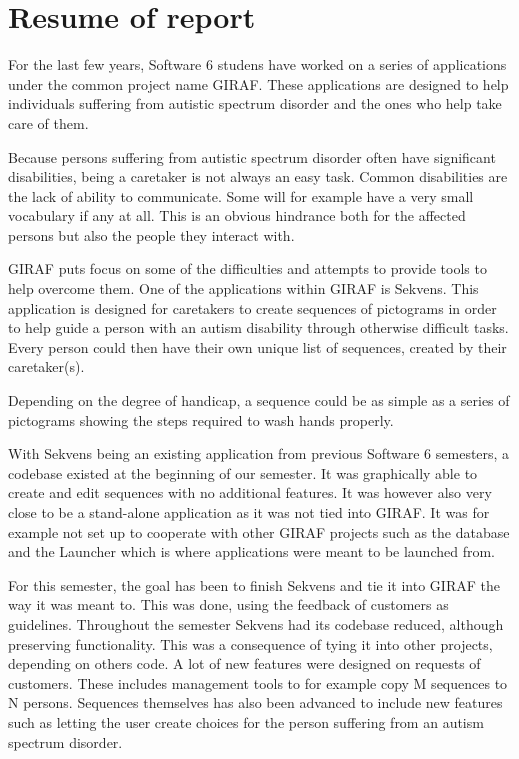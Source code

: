 \chapter{Resume of report}\label{app:resume}
For the last few years, Software 6 studens have worked on a series of applications under the common project name GIRAF. These applications are designed to help individuals suffering from autistic spectrum disorder and the ones who help take care of them.

Because persons suffering from autistic spectrum disorder often have significant disabilities, being a caretaker is not always an easy task. Common disabilities are the lack of ability to communicate. Some will for example have a very small vocabulary if any at all. This is an obvious hindrance both for the affected persons but also the people they interact with.

GIRAF puts focus on some of the difficulties and attempts to provide tools to help overcome them. One of the applications within GIRAF is Sekvens. This application is designed for caretakers to create sequences of pictograms in order to help guide a person with an autism disability through otherwise difficult tasks. Every person could then have their own unique list of sequences, created by their caretaker(s).

Depending on the degree of handicap, a sequence could be as simple as a series of pictograms showing the steps required to wash hands properly.

With Sekvens being an existing application from previous Software 6 semesters, a codebase existed at the beginning of our semester. It was graphically able to create and edit sequences with no additional features. It was however also very close to be a stand-alone application as it was not tied into GIRAF. It was for example not set up to cooperate with other GIRAF projects such as the database and the Launcher which is where applications were meant to be launched from.

For this semester, the goal has been to finish Sekvens and tie it into GIRAF the way it was meant to. This was done, using the feedback of customers as guidelines. Throughout the semester Sekvens had its codebase reduced, although preserving functionality. This was a consequence of tying it into other projects, depending on others code. A lot of new features were designed on requests of customers. These includes management tools to for example copy M sequences to N persons. Sequences themselves has also been advanced to include new features such as letting the user create choices for the person suffering from an autism spectrum disorder.

